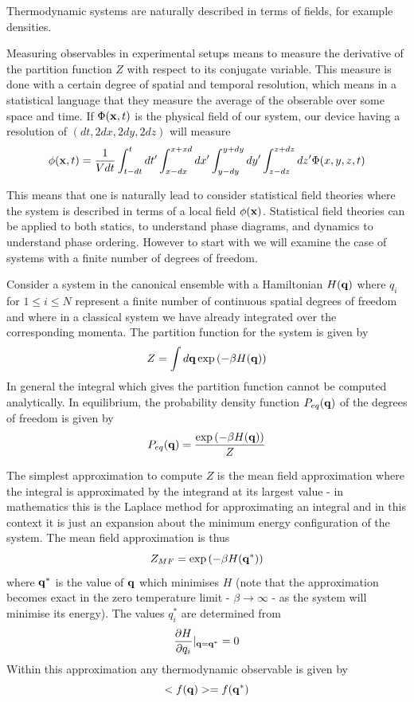 Thermodynamic systems are naturally described in terms of fields, for example densities. 

{\color{red} 
Measuring observables in experimental setups means to measure the derivative of the partition function $Z$ with respect to its conjugate variable. This measure is done with a certain degree of spatial and temporal resolution, which means in a statistical language that they measure the average of the obserable over some space and time. If $\Phi({\bf x},t)$ is the physical field of our system, our device having a resolution of $(dt,2dx,2dy,2dz)$ will measure
\begin{align}
    \phi({\bf x},t) = \frac{1}{V dt} \int_{t-dt}^{t} dt' \int_{x-dx}^{x+xd} dx' \int_{y-dy}^{y+dy} dy' \int_{z-dz}^{z+dz} dz' \Phi(x,y,z,t)
    \label{renormalisation}
\end{align}
}

This means that one is naturally lead to consider statistical field theories where the system is described in terms of a local field $\phi({\bf x})$. Statistical field theories can be applied to both statics, to understand phase diagrams, and dynamics to understand phase ordering. However to start with we will examine the case of systems with a finite number of degrees of freedom. 

Consider a system in the canonical ensemble with a Hamiltonian $H({\bf q})$ where $q_i$ for 
$1\leq i\leq N$ represent a finite number of continuous spatial degrees of freedom and where in a classical system we have already integrated over the corresponding momenta. The partition function for the system is given by
\begin{equation}
    Z = \int d{\bf q} \exp\left(-\beta H({\bf q})\right)
\end{equation}
In general the integral which gives the  partition function cannot be computed analytically. In equilibrium, the probability density function $P_{eq}({\bf q})$ of the degrees of freedom is given by 
\begin{equation}
    P_{eq}({\bf q}) = \frac{\exp\left(-\beta H({\bf q})\right)}{Z}
    \label{eqdis}
\end{equation}

The simplest approximation to compute $Z$ is the mean field approximation where the integral 
is approximated by the integrand at its largest value - in mathematics this is the Laplace method for approximating an integral and in this context it is just an expansion about the minimum energy configuration of the system. The mean field approximation is thus
\begin{equation}
    Z_{MF}= \exp\left(-\beta H({\bf q}^*)\right)
\end{equation}
where ${\bf q}^*$ is the value of ${\bf q}$ which minimises $H$ (note that the approximation becomes exact in the zero temperature limit - $\beta \to \infty$   - as the system will minimise its energy). The values $q_i^*$ are determined from
\begin{equation}
    \frac{\partial H}{\partial q_i}|_{{\bf q}={\bf q^*}}=0
\end{equation}
Within this approximation any thermodynamic observable is given by
\begin{equation}
    < f({\bf q}) > = f({\bf q}^*)
\end{equation}

